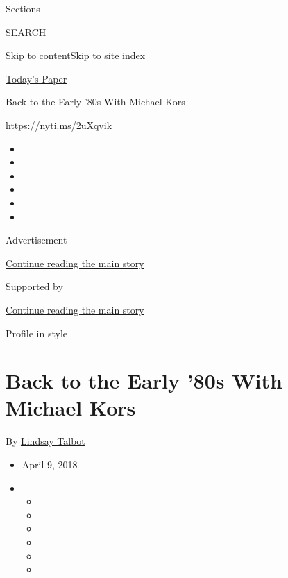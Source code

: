 Sections

SEARCH

\protect\hyperlink{site-content}{Skip to
content}\protect\hyperlink{site-index}{Skip to site index}

\href{https://myaccount.nytimes3xbfgragh.onion/auth/login?response_type=cookie\&client_id=vi}{}

\href{https://www.nytimes3xbfgragh.onion/section/todayspaper}{Today's
Paper}

Back to the Early '80s With Michael Kors

\url{https://nyti.ms/2uXqvik}

\begin{itemize}
\item
\item
\item
\item
\item
\item
\end{itemize}

Advertisement

\protect\hyperlink{after-top}{Continue reading the main story}

Supported by

\protect\hyperlink{after-sponsor}{Continue reading the main story}

Profile in style

\hypertarget{back-to-the-early-80s-with-michael-kors}{%
\section{Back to the Early '80s With Michael
Kors}\label{back-to-the-early-80s-with-michael-kors}}

By \href{https://www.nytimes3xbfgragh.onion/by/lindsay-talbot}{Lindsay
Talbot}

\begin{itemize}
\item
  April 9, 2018
\item
  \begin{itemize}
  \item
  \item
  \item
  \item
  \item
  \item
  \end{itemize}
\end{itemize}

